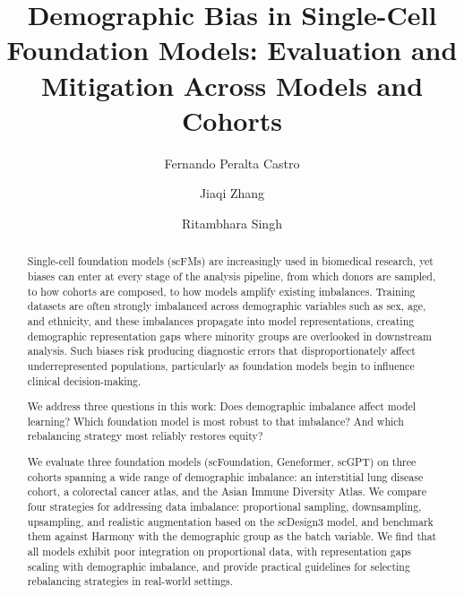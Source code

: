 \documentclass[sigconf]{acmart}
\begin{document}
\title[Demographic Bias in Single-Cell Foundation Models]{Demographic Bias in Single-Cell Foundation Models: Evaluation and Mitigation Across Models and Cohorts}

\author{Fernando Peralta Castro}

\author{Jiaqi Zhang}

\author{Ritambhara Singh}
\authornotemark[1]

\renewcommand{\shortauthors}{Peralta Castro et al.}

\begin{abstract}
Single-cell foundation models (scFMs) are increasingly used in biomedical research, yet biases can enter at every stage of the analysis pipeline, from which donors are sampled, to how cohorts are composed, to how models amplify existing imbalances. Training datasets are often strongly imbalanced across demographic variables such as sex, age, and ethnicity, and these imbalances propagate into model representations, creating demographic representation gaps where minority groups are overlooked in downstream analysis. Such biases risk producing diagnostic errors that disproportionately affect underrepresented populations, particularly as foundation models begin to influence clinical decision-making.

We address three questions in this work: Does demographic imbalance affect model learning? Which foundation model is most robust to that imbalance? And which rebalancing strategy most reliably restores equity?

We evaluate three foundation models (scFoundation, Geneformer, scGPT) on three cohorts spanning a wide range of demographic imbalance: an interstitial lung disease cohort, a colorectal cancer atlas, and the Asian Immune Diversity Atlas. We compare four strategies for addressing data imbalance: proportional sampling, downsampling, upsampling, and realistic augmentation based on the scDesign3 model, and benchmark them against Harmony with the demographic group as the batch variable. We find that all models exhibit poor integration on proportional data, with representation gaps scaling with demographic imbalance, and provide practical guidelines for selecting rebalancing strategies in real-world settings.\end{abstract}
\end{document}
